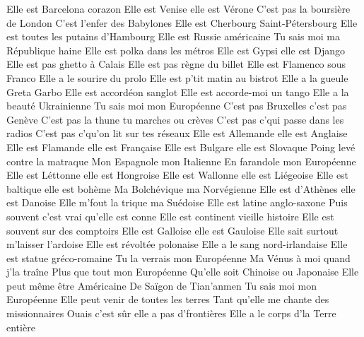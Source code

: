Elle est Barcelona corazon
Elle est Venise elle est Vérone
C'est pas la boursière de London
C'est l'enfer des Babylones
Elle est Cherbourg Saint-Pétersbourg
Elle est toutes les putains d'Hambourg
Elle est Russie américaine
Tu sais moi ma République haine
Elle est polka dans les métros
Elle est Gypsi elle est Django
Elle est pas ghetto à Calais
Elle est pas règne du billet
Elle est Flamenco sous Franco
Elle a le sourire du prolo
Elle est p'tit matin au bistrot
Elle a la gueule Greta Garbo
Elle est accordéon sanglot
Elle est accorde-moi un tango
Elle a la beauté Ukrainienne
Tu sais moi mon Européenne
C'est pas Bruxelles c'est pas Genève
C'est pas la thune tu marches ou crèves
C'est pas c'qui passe dans les radios
C'est pas c'qu'on lit sur tes réseaux
Elle est Allemande elle est Anglaise
Elle est Flamande elle est Française
Elle est Bulgare elle est Slovaque
Poing levé contre la matraque
Mon Espagnole mon Italienne
En farandole mon Européenne
Elle est Léttonne elle est Hongroise
Elle est Wallonne elle est Liégeoise
Elle est baltique elle est bohème
Ma Bolchévique ma Norvégienne
Elle est d'Athènes elle est Danoise
Elle m'fout la trique ma Suédoise
Elle est latine anglo-saxone
Puis souvent c'est vrai qu'elle est conne
Elle est continent vieille histoire
Elle est souvent sur des comptoirs
Elle est Galloise elle est Gauloise
Elle sait surtout m'laisser l'ardoise
Elle est révoltée polonaise
Elle a le sang nord-irlandaise
Elle est statue gréco-romaine
Tu la verrais mon Européenne
Ma Vénus à moi quand j'la traîne
Plus que tout mon Européenne
Qu'elle soit Chinoise ou Japonaise
Elle peut même être Américaine
De Saïgon de Tian'anmen
Tu sais moi mon Européenne
Elle peut venir de toutes les terres
Tant qu'elle me chante des missionnaires
Ouais c'est sûr elle a pas d'frontières
Elle a le corps d'la Terre entière